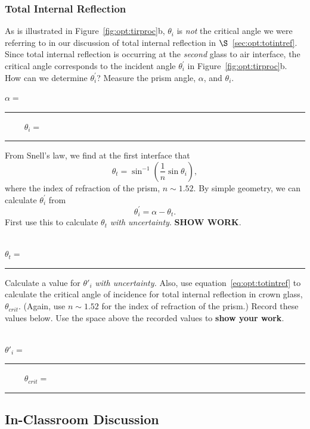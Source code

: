 \subsubsection{Total Internal Reflection}


As is illustrated in Figure~\ref{fig:opt:tirproc}b, $\theta_i$ is 
{\it not} the critical angle we were referring to in our discussion of total 
internal reflection in $\S$~\ref{sec:opt:totintref}. Since total internal 
reflection is occurring at the {\it second} glass to air interface, the 
critical angle corresponds to the incident angle $\theta_i^\prime$ in  
Figure~\ref{fig:opt:tirproc}b.  How can we determine $\theta_i^\prime$?  
Measure the prism angle, $\alpha$, and $\theta_i$.  \\
\begin{center}
$\alpha = $~ \rule{3cm}{.1mm} ~~~~
$\theta _i=$~ \rule{3cm}{.1mm}
\end{center}
\vspace*{.5cm}

\noindent From Snell's law, we find at the first interface that
$$
\theta_t = \sin^{-1}\left( \frac{1}{n} \sin\theta_i \right),
$$
where the index of refraction of the prism, $n\sim 1.52$.  By simple
geometry, we can calculate $\theta_i^\prime$ from
$$
\theta_i^\prime = \alpha-\theta_t.
$$
First use this to calculate $\theta_t$ {\it with uncertainty}. {\bf SHOW WORK}.
\\
\vspace*{2cm} \\
\begin{center}
$\theta _t=$~ \rule{3cm}{.1mm}
\end{center} 

\noindent
Calculate a value for $\theta '_i$ {\it with uncertainty.} 
Also, use equation~\ref{eq:opt:totintref} to calculate the critical angle of
incidence for total internal reflection in crown glass, $\theta _{crit}.$
(Again, use $n \sim 1.52$ for the index of refraction of the prism.) Record
these values below.  Use the space above the recorded values to {\bf show your
work}. \\
\vspace*{3.5cm} \\
\begin{center}
$\theta '_i=$~ \rule{3cm}{.1mm} ~~~~ 
$\theta _{crit}=$~ \rule{3cm}{.1mm}
\end{center} 


\subsection{In-Classroom Discussion}
